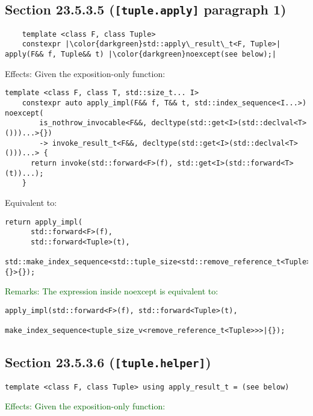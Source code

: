 \documentclass{article}
\begin{document}
\subsection{Section 23.5.3.5 (\texttt{[tuple.apply]} paragraph 1)}
\begin{lstlisting}
    template <class F, class Tuple>
    constexpr |\color{darkgreen}std::apply\_result\_t<F, Tuple>| apply(F&& f, Tuple&& t) |\color{darkgreen}noexcept(see below);|
\end{lstlisting}

Effects: Given the exposition-only function:

\begin{lstlisting}[style=base]
    template <class F, class T, std::size_t... I>
    constexpr auto apply_impl(F&& f, T&& t, std::index_sequence<I...>) noexcept(
        is_nothrow_invocable<F&&, decltype(std::get<I>(std::declval<T>()))...>{})
        -> invoke_result_t<F&&, decltype(std::get<I>(std::declval<T>()))...> {
      return invoke(std::forward<F>(f), std::get<I>(std::forward<T>(t))...);
    }
\end{lstlisting}

Equivalent to:

\begin{lstlisting}[style=base]
  return apply_impl(
      std::forward<F>(f),
      std::forward<Tuple>(t),
      std::make_index_sequence<std::tuple_size<std::remove_reference_t<Tuple>>{}>{});
\end{lstlisting}

\textcolor{darkgreen}{Remarks: The expression inside noexcept is equivalent to:}

\begin{lstlisting}[style=base]
    apply_impl(std::forward<F>(f), std::forward<Tuple>(t),
               make_index_sequence<tuple_size_v<remove_reference_t<Tuple>>>|{});
\end{lstlisting}

\subsection{Section 23.5.3.6 (\texttt{[tuple.helper]})}

\begin{lstlisting}[style=base]
    template <class F, class Tuple> using apply_result_t = (see below)
\end{lstlisting}

\textcolor{darkgreen}{Effects: Given the exposition-only function:}
\end{document}
